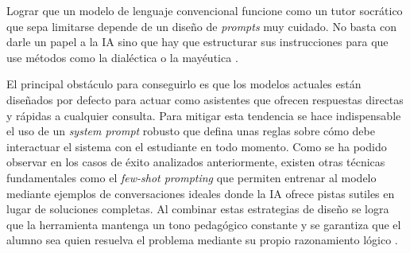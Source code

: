 Lograr que un modelo de lenguaje convencional funcione como un tutor socrático que sepa limitarse depende de un diseño de \textit{prompts} muy cuidado. No basta con darle un papel a la IA sino que hay que estructurar sus instrucciones para que use métodos como la dialéctica o la mayéutica \cite{chang2023prompting}. 

El principal obstáculo para conseguirlo es que los modelos actuales están diseñados por defecto para actuar como asistentes que ofrecen respuestas directas y rápidas a cualquier consulta. Para mitigar esta tendencia se hace indispensable el uso de un \textit{system prompt} robusto que defina unas reglas sobre cómo debe interactuar el sistema con el estudiante en todo momento. Como se ha podido observar en los casos de éxito analizados anteriormente, existen otras técnicas fundamentales como el \textit{few-shot prompting} que permiten entrenar al modelo mediante ejemplos de conversaciones ideales donde la IA ofrece pistas sutiles en lugar de soluciones completas. Al combinar estas estrategias de diseño se logra que la herramienta mantenga un tono pedagógico constante y se garantiza que el alumno sea quien resuelva el problema mediante su propio razonamiento lógico \cite{kargupta2024instruct}.